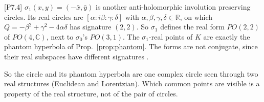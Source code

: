 \documentclass[11pt]{article}
\theoremstyle{definition}\newtheorem{definition}[theorem]{Definition}\newtheorem{remark}[theorem]{Remark}\newtheorem{example}[theorem]{Example}
\newcommand{\C}{\mathbb{C}}\newcommand{\R}{\mathbb{R}}\newcommand{\PP}{\mathbb{P}}
\newcommand{\chk}[1]{\hfill{\footnotesize\textsf{[#1]}}}
\begin{document}
\begin{proposition}\label{prop:sigma1}\chk{P7.4}
$\sigma_1(x,y)=(-\bar x,\bar y)$ is another anti-holomorphic involution preserving circles. Its real circles are $[\alpha:i\beta:\gamma:\delta]$ with $\alpha,\beta,\gamma,\delta\in\R$, on which $Q=-\beta^2+\gamma^2-4\alpha\delta$ has signature $(2,2)$. So $\sigma_1$ defines the real form $PO(2,2)$ of $PO(4,\C)$, next to $\sigma_0$'s $PO(3,1)$. The $\sigma_1$-real points of $K$ are exactly the phantom hyperbola of Prop.~\ref{prop:phantom}. The forms are not conjugate, since their real subspaces have different signatures \cite{wu}.
\end{proposition}
\noindent So the circle and its phantom hyperbola are one complex circle seen through two real structures (Euclidean and Lorentzian). Which common points are visible is a property of the real structure, not of the pair of circles.
\end{document}
